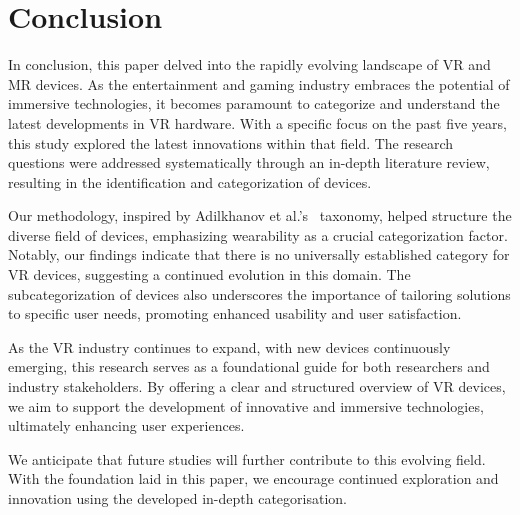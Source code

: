 \section{Conclusion}
\label{sec:conclusion}

In conclusion, this paper delved into the rapidly evolving landscape of VR and MR devices. As the entertainment and gaming industry embraces the potential of immersive technologies, it becomes paramount to categorize and understand the latest developments in VR hardware. With a specific focus on the past five years, this study explored the latest innovations within that field. The research questions were addressed systematically through an in-depth literature review, resulting in the identification and categorization of devices.

Our methodology, inspired by Adilkhanov et al.'s~\cite{Adilkhanov22} taxonomy, helped structure the diverse field of devices, emphasizing wearability as a crucial categorization factor. Notably, our findings indicate that there is no universally established category for VR devices, suggesting a continued evolution in this domain. The subcategorization of devices also underscores the importance of tailoring solutions to specific user needs, promoting enhanced usability and user satisfaction.

As the VR industry continues to expand, with new devices continuously emerging, this research serves as a foundational guide for both researchers and industry stakeholders. By offering a clear and structured overview of VR devices, we aim to support the development of innovative and immersive technologies, ultimately enhancing user experiences.

We anticipate that future studies will further contribute to this evolving field. With the foundation laid in this paper, we encourage continued exploration and innovation using the developed in-depth categorisation.